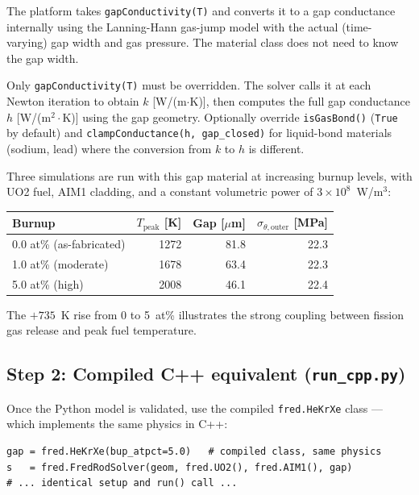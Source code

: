 \documentclass[11pt,a4paper]{article}
\begin{document}
The platform takes \texttt{gapConductivity(T)} and converts it to a gap
conductance internally using the Lanning-Hann gas-jump model with the
actual (time-varying) gap width and gas pressure.  The material class does
not need to know the gap width.

\begin{infobox}
  Only \texttt{gapConductivity(T)} must be overridden.  The solver calls it
  at each Newton iteration to obtain $k$ [W/(m$\cdot$K)], then computes the
  full gap conductance $h$ [W/(m$^2\cdot$K)] using the gap geometry.
  Optionally override \texttt{isGasBond()} (\texttt{True} by default) and
  \texttt{clampConductance(h, gap\_closed)} for liquid-bond materials
  (sodium, lead) where the conversion from $k$ to $h$ is different.
\end{infobox}

Three simulations are run with this gap material at increasing burnup levels,
with UO2 fuel, AIM1 cladding, and a constant volumetric power of
$3\times10^8$~W/m$^3$:

\begin{center}
\begin{tabular}{lrrr}
\toprule
Burnup & $T_\text{peak}$ [K] & Gap [$\mu$m] & $\sigma_{\theta,\text{outer}}$ [MPa] \\
\midrule
0.0 at\% (as-fabricated) & 1272 & 81.8 & 22.3 \\
1.0 at\% (moderate)      & 1678 & 63.4 & 22.3 \\
5.0 at\% (high)          & 2008 & 46.1 & 22.4 \\
\bottomrule
\end{tabular}
\end{center}

The $+735$~K rise from 0 to 5~at\% illustrates the strong coupling between
fission gas release and peak fuel temperature.

\subsection{Step 2: Compiled C++ equivalent (\texttt{run\_cpp.py})}

Once the Python model is validated, use the compiled \texttt{fred.HeKrXe}
class --- which implements the same physics in C++:

\begin{lstlisting}
gap = fred.HeKrXe(bup_atpct=5.0)   # compiled class, same physics
s   = fred.FredRodSolver(geom, fred.UO2(), fred.AIM1(), gap)
# ... identical setup and run() call ...
\end{lstlisting}
\end{document}
